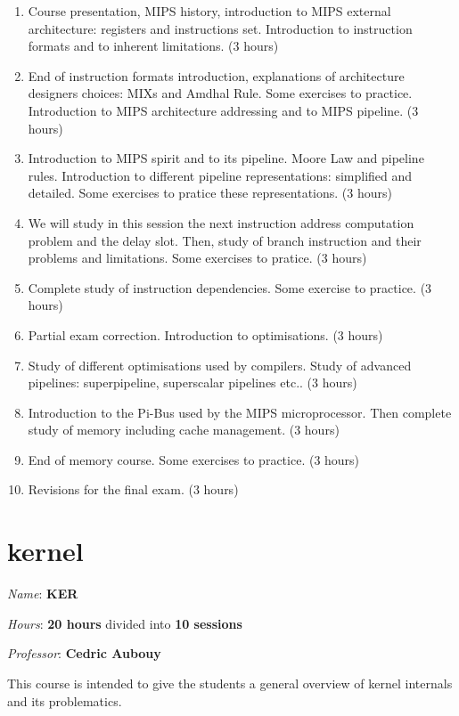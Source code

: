 \begin{multicols}{2}
\begin{enumerate}
  \item
    Course presentation, MIPS history, introduction to MIPS external
    architecture: registers and instructions set. Introduction to
    instruction formats and to inherent limitations. (3 hours)
  \item
    End of instruction formats introduction, explanations of architecture
    designers choices: MIXs and Amdhal Rule. Some exercises to practice.
    Introduction to MIPS architecture addressing and to MIPS pipeline.
    (3 hours)
  \item
    Introduction to MIPS spirit and to its pipeline. Moore Law and
    pipeline rules. Introduction to different pipeline representations:
    simplified and detailed. Some exercises to pratice these representations.
    (3 hours)
  \item
    We will study in this session the next instruction address computation
    problem and the delay slot. Then, study of branch instruction and their
    problems and limitations. Some exercises to pratice. (3 hours)
  \item
    Complete study of instruction dependencies. Some exercise to practice.
    (3 hours)
  \item
    Partial exam correction. Introduction to optimisations. (3 hours)
  \item
    Study of different optimisations used by compilers. Study of
    advanced pipelines: superpipeline, superscalar pipelines etc.. (3 hours)
  \item
    Introduction to the Pi-Bus used by the MIPS microprocessor. Then complete
    study of memory including cache management. (3 hours)
  \item
    End of memory course. Some exercises to practice. (3 hours)
  \item
    Revisions for the final exam. (3 hours)
\end{enumerate}

%
%

\section{kernel}

\textit{Name}: \textbf{KER}

\textit{Hours}: \textbf{20 hours} divided into \textbf{10 sessions}

\textit{Professor}: \textbf{Cedric Aubouy}

This course is intended to give the students a general overview of
kernel internals and its problematics.


\end{multicols}
